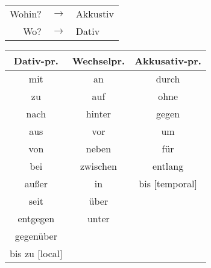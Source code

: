 
\begin{tabular}{rcl}
Wohin? & $\rightarrow$ & Akkustiv \\
Wo? & $\rightarrow$ & Dativ
\end{tabular}

\begin{tabular}{|c|c|c|}
\hline
Dativ-pr. & Wechselpr. & Akkusativ-pr. \\
\hline
mit & an & durch \\
zu & auf & ohne \\
nach & hinter & gegen \\
aus & vor & um \\
von & neben & f\"ur \\
bei & zwischen & entlang \\
au\ss er & in & bis [temporal] \\
seit & \"uber & ~ \\
entgegen & unter & ~ \\
gegen\"uber & ~ & ~ \\
bis zu [local] & ~ & ~ \\
\hline
\end{tabular}
